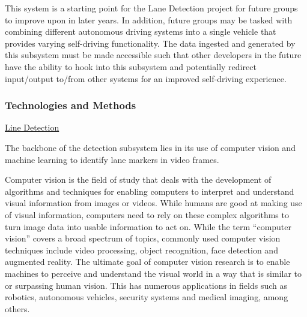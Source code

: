 \documentclass[titlepage,draft]{article}
\begin{document}
\begin{itemize}
	      This system is a starting point for the Lane Detection project for future groups to improve upon in later years.
	      In addition, future groups may be tasked with combining different autonomous driving systems into a single vehicle that provides
	      varying self-driving functionality.
	      The data ingested and generated by this subsystem must be made accessible such that other developers in the future have the
	      ability to hook into this subsystem and potentially redirect input/output to/from other systems for an improved self-driving
	      experience.
\end{itemize}


\subsubsection{Technologies and Methods}

\underline{Line Detection}

The backbone of the detection subsystem lies in its use of computer vision and machine learning to identify lane markers in video
frames.

Computer vision is the field of study that deals with the development of algorithms and techniques for enabling computers
to interpret and understand visual information from images or videos.
While humans are good at making use of visual information, computers need to rely on these complex algorithms to turn image
data into usable information to act on.
While the term ``computer vision'' covers a broad spectrum of topics, commonly used computer vision techniques include video
processing, object recognition, face detection and augmented reality.
The ultimate goal of computer vision research is to enable machines to perceive and understand the visual world in a way that
is similar to or surpassing human vision.
This has numerous applications in fields such as robotics, autonomous vehicles, security systems and medical imaging, among
others.
\end{document}
